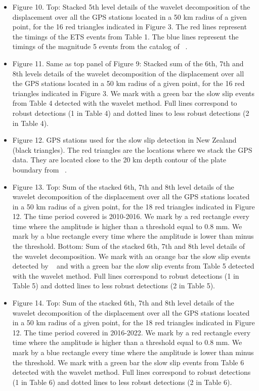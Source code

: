 \documentclass{article}
\begin{document}
\begin{itemize}
\item Figure 10. Top: Stacked 5th level details of the wavelet decomposition of the displacement over all the GPS stations located in a 50 km radius of a given point, for the 16 red triangles indicated in Figure 3. The red lines represent the timings of the ETS events from Table 1. The blue lines represent the timings of the magnitude 5 events from the catalog of ~\citet{MIC_2019}.

\item Figure 11. Same as top panel of Figure 9: Stacked sum of the 6th, 7th and 8th levels details of the wavelet decomposition of the displacement over all the GPS stations located in a 50 km radius of a given point, for the 16 red triangles indicated in Figure 3. We mark with a green bar the slow slip events from Table 4 detected with the wavelet method. Full lines correspond to robust detections (1 in Table 4) and dotted lines to less robust detections (2 in Table 4).

\item Figure 12. GPS stations used for the slow slip detection in New Zealand (black triangles). The red triangles are the locations where we stack the GPS data. They are located close to the 20 km depth contour of the plate boundary from ~\citet{WIL_2013}.

\item Figure 13. Top: Sum of the stacked 6th, 7th and 8th level details of the wavelet decomposition of the displacement over all the GPS stations located in a 50 km radius of a given point, for the 18 red triangles indicated in Figure 12. The time period covered is 2010-2016. We mark by a red rectangle every time where the amplitude is higher than a threshold equal to 0.8 mm. We mark by a blue rectangle every time where the amplitude is lower than minus the threshold. Bottom: Sum of the stacked 6th, 7th and 8th level details of the wavelet decomposition. We mark with an orange bar the slow slip events detected by ~\citet{TOD_2016} and with a green bar the slow slip events from Table 5 detected with the wavelet method. Full lines correspond to robust detections (1 in Table 5) and dotted lines to less robust detections (2 in Table 5).

\item Figure 14. Top: Sum of the stacked 6th, 7th and 8th level details of the wavelet decomposition of the displacement over all the GPS stations located in a 50 km radius of a given point, for the 18 red triangles indicated in Figure 12. The time period covered in 2016-2022. We mark by a red rectangle every time where the amplitude is higher than a threshold equal to 0.8 mm. We mark by a blue rectangle every time where the amplitude is lower than minus the threshold. We mark with a green bar the slow slip events from Table 6 detected with the wavelet method. Full lines correspond to robust detections (1 in Table 6) and dotted lines to less robust detections (2 in Table 6).

\end {itemize}
\end{document}
